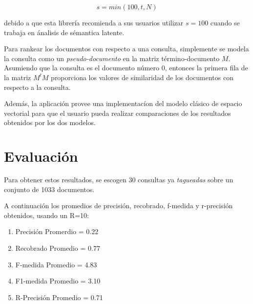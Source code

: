 \documentclass[a4paper, 10pt]{article}
\begin{document}
	\begin{equation}
		s = min(100, t, N)	
	\end{equation}

	debido a que esta librer\'ia recomienda a sus usuarios utilizar $s = 100$ cuando se trabaja en \'analisis de s\'emantica latente.

	Para rankear los documentos con respecto a una consulta, simplemente se modela la consulta como un 
	\textit{pseudo-documento} en la matriz t\'ermino-documento $M$. Asumiendo que la consulta es el 
	documento n\'umero 0, entonces la primera fila de la matriz $M^tM$ proporciona los valores de similaridad de los documentos
	con respecto a la consulta.

	Adem\'as, la aplicaci\'on provee una implementac\'ion del modelo cl\'asico de espacio vectorial para que
	el usuario pueda realizar comparaciones de los resultados obtenidos por los dos modelos.

	\section{Evaluación}
	Para obtener estos resultados, se escogen 30 consultas ya \textit{tagueadas} sobre un conjunto de 1033 documentos.
	
	A continuación los promedios de precisión, recobrado, f-medida y r-precisión obtenidos, usando un R=10:
	
	\begin{enumerate}
       \item Precisión Promerdio = 0.22
        \item Recobrado Promedio = 0.77
        \item F-medida Promedio = 4.83
        \item F1-medida Promedio = 3.10
        \item R-Precisión Promedio = 0.71

    \end{enumerate}
\end{document}

